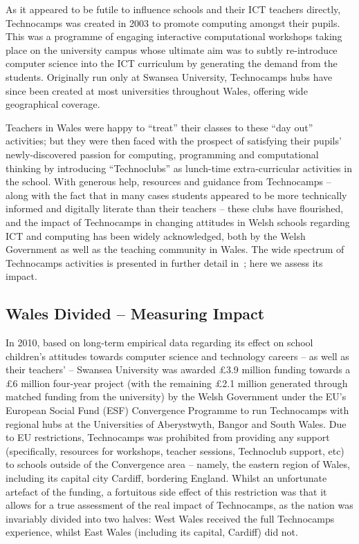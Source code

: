 \documentclass[conference]{IEEEtran}
\begin{document}
As it appeared to be futile to influence schools and their ICT
teachers directly, Technocamps was created in 2003 to promote
computing amongst their pupils.  This was a programme of engaging
interactive computational workshops taking place on the university
campus whose ultimate aim was to subtly re-introduce computer science
into the ICT curriculum by generating the demand from the students.
Originally run only at Swansea University, Technocamps hubs have since
been created at most universities throughout Wales, offering wide
geographical coverage.

Teachers in Wales were happy to ``treat'' their classes to these ``day
out'' activities; but they were then faced with the prospect of
satisfying their pupils' newly-discovered passion for computing,
programming and computational thinking by introducing ``Technoclubs''
as lunch-time extra-curricular activities in the school.  With
generous help, resources and guidance from Technocamps -- along with
the fact that in many cases students appeared to be more technically
informed and digitally literate than their
teachers -- these clubs have
flourished, and the impact of Technocamps in changing attitudes in
Welsh schools regarding ICT and computing has been widely
acknowledged, both by the Welsh Government
as well as the teaching community in Wales.
The wide spectrum of Technocamps activities is presented in further
detail in~\cite{crick+moller-wipsce2015}; here we assess its impact.

\subsection{Wales Divided -- Measuring Impact}
\label{walesdivided}

In 2010, based on long-term empirical data regarding its effect on
school children's attitudes towards computer science and technology
careers -- as well as their teachers' -- Swansea University was
awarded \pounds 3.9 million funding towards a \pounds 6 million
four-year project (with the remaining \pounds 2.1 million generated
through matched funding from the university) by the Welsh Government
under the EU's European Social Fund (ESF) Convergence Programme to run
Technocamps with regional hubs at the Universities of Aberystwyth,
Bangor and South Wales.  Due to EU
restrictions, Technocamps was prohibited from providing any support
(specifically, resources for workshops, teacher sessions, Technoclub
support, etc) to schools outside of the Convergence area -- namely,
the eastern region of Wales, including its capital city Cardiff,
bordering England.  Whilst an unfortunate artefact of the funding, a
fortuitous side effect of this restriction was that it allows for a
true assessment of the real impact of Technocamps, as the nation was
invariably divided into two halves: West Wales received the full
Technocamps experience, whilst East Wales (including its capital,
Cardiff) did not.
\end{document}
